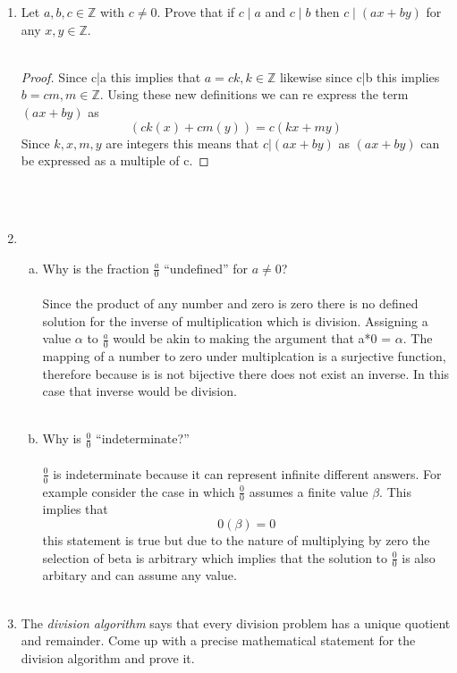 \documentclass[11pt]{article}
\def\Z{\mathbb{Z}}
\begin{document}
\begin{enumerate}
\item Let $a, b, c \in \Z$ with $c \ne 0$.
Prove that if $c \mid a$ and $c \mid b$ then $c \mid (ax+by)$ for any $x, y \in \Z$.\\\\
\begin{proof}
  Since c|a this implies that $a=ck,k \in \mathbb{Z}$ likewise since c|b this implies $b=cm, m\in \mathbb{Z}$. Using these new definitions we can re express the term $(ax+by)$ as \[
    (ck(x)+cm(y))=c(kx+my)
  \]
  Since $k,x,m,y$ are integers this means that $c|(ax+by)$ as $(ax+by)$ can be expressed as a multiple of c.
\end{proof}
\\\\
\item
\begin{enumerate}[(a)]
  \item Why is the fraction $\frac{a}{0}$ ``undefined'' for $a \ne 0$?\\\\
  Since the product of any number and zero is zero there is no defined solution for the inverse of multiplication which is division. Assigning a value $\alpha$ to $\frac{a}{0}$ would be akin to making the argument that a*0 = $\alpha$. The mapping of a number to zero under multiplcation is a surjective function, therefore because is is not bijective there does not exist an inverse. In this case that inverse would be division. \\\\
  \item Why is $\frac{0}{0}$ ``indeterminate?''
  \\\\
  $\frac{0}{0}$ is indeterminate because it can represent infinite different answers. For example consider the case in which   $\frac{0}{0}$ assumes a finite value $\beta$. This implies that \[
    0(\beta)=0
  \]
  this statement is true but due to the nature of multiplying by zero the selection of beta is arbitrary which implies that the solution to $\frac{0}{0}$ is also arbitary and can assume any value.
  \\\\
\end{enumerate}

\item The \emph{division algorithm} says that every division problem has a unique quotient and remainder.
Come up with a precise mathematical statement for the division algorithm and prove it.


\end{enumerate}
\end{document}
